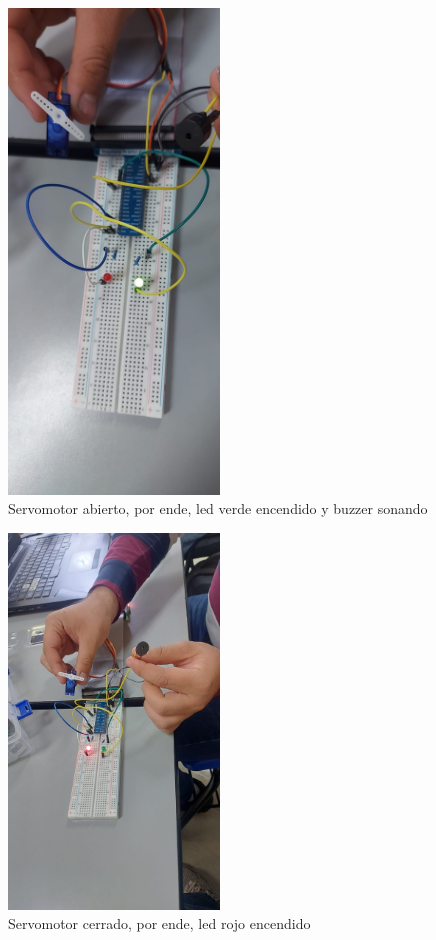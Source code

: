 \begin{figure}[h]
	\centering
   \includegraphics[width=0.5\textwidth]{imagenes/ledVerde_buzzer_servo.jpg} 
	\caption{Servomotor abierto, por ende, led verde encendido y buzzer sonando}
\end{figure}

\begin{figure}[h]
	\centering
	\includegraphics[width=0.5\textwidth]{imagenes/ledRojo_servo.jpg}
	\caption{Servomotor cerrado, por ende, led rojo encendido}
\end{figure}

\newpage
